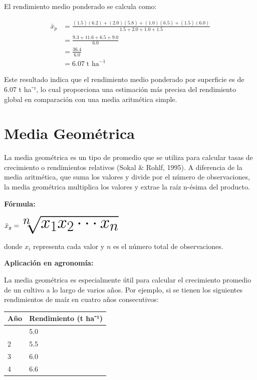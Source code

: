 \documentclass[
  spanish,
  letterpaper,
]{book}
\begin{document}
El rendimiento medio ponderado se calcula como:

\[\begin{aligned}
\bar{x}_p &= \frac{(1.5)(6.2) + (2.0)(5.8) + (1.0)(6.5) + (1.5)(6.0)}{1.5 + 2.0 + 1.0 + 1.5} \\[4pt]
          &= \frac{9.3 + 11.6 + 6.5 + 9.0}{6.0} \\[4pt]
          &= \frac{36.4}{6.0} \\[4pt]
          &= 6.07\; \text{t ha}^{-1}
\end{aligned}\]

Este resultado indica que el rendimiento medio ponderado por superficie
es de 6.07 t ha⁻¹, lo cual proporciona una estimación más precisa del
rendimiento global en comparación con una media aritmética simple.

\section{Media Geométrica}\label{media-geomuxe9trica}

La media geométrica es un tipo de promedio que se utiliza para calcular
tasas de crecimiento o rendimientos relativos (Sokal \& Rohlf, 1995). A
diferencia de la media aritmética, que suma los valores y divide por el
número de observaciones, la media geométrica multiplica los valores y
extrae la raíz n-ésima del producto.

\textbf{Fórmula:}

\(\Huge\bar{x}_g = \sqrt[n]{x_1 x_2 \cdots x_n}\)

donde \(x_i\)\hspace{0pt} representa cada valor y \(n\) es el número
total de observaciones.

\textbf{Aplicación en agronomía:}

La media geométrica es especialmente útil para calcular el crecimiento
promedio de un cultivo a lo largo de varios años. Por ejemplo, si se
tienen los siguientes rendimientos de maíz en cuatro años consecutivos:

\begin{longtable}[]{@{}ll@{}}
\toprule\noalign{}
Año & Rendimiento (t ha⁻¹) \\
\midrule\noalign{}
\endhead
\bottomrule\noalign{}
\endlastfoot
1 & 5.0 \\
2 & 5.5 \\
3 & 6.0 \\
4 & 6.6 \\
\end{longtable}
\end{document}

